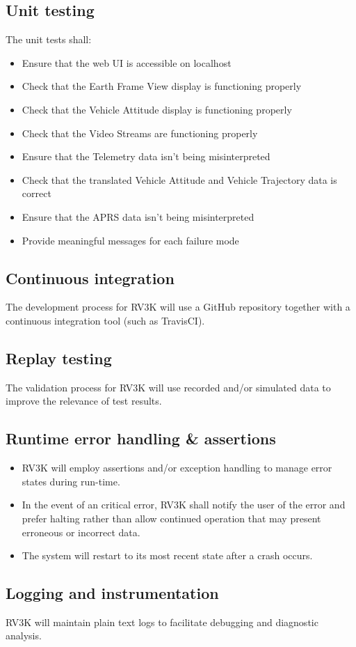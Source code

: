 \subsection{Unit testing}
The unit tests shall:
  \begin{itemize}
    \item Ensure that the web UI is accessible on localhost
    \item Check that the Earth Frame View display is functioning properly
    \item Check that the Vehicle Attitude display is functioning properly
    \item Check that the Video Streams are functioning properly
    \item Ensure that the Telemetry data isn't being misinterpreted
    \item Check that the translated Vehicle Attitude and Vehicle Trajectory data is correct
    \item Ensure that the APRS data isn't being misinterpreted
    \item Provide meaningful messages for each failure mode
  \end{itemize}

\subsection{Continuous integration}
The development process for RV3K will use a GitHub repository together with a
continuous integration tool (such as TravisCI).

\subsection{Replay testing}
The validation process for RV3K will use recorded and/or simulated data to improve the relevance of test results.

\subsection{Runtime error handling \& assertions}
  \begin{itemize}
    \item RV3K will employ assertions and/or exception handling to manage error states during run-time.
    \item In the event of an critical error, RV3K shall notify the user of the
    error and prefer halting
    rather than allow continued operation that may present erroneous or incorrect data.
    \item The system will restart to its most recent state after a crash occurs.
  \end{itemize}

\subsection{Logging and instrumentation}
RV3K will maintain plain text logs to facilitate debugging and diagnostic analysis.
